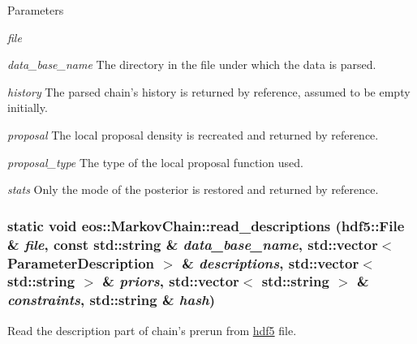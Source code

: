 \begin{DoxyParams}{Parameters}
\item[{\em file}]\item[{\em data\_\-base\_\-name}]The directory in the file under which the data is parsed. \item[{\em history}]The parsed chain's history is returned by reference, assumed to be empty initially. \item[{\em proposal}]The local proposal density is recreated and returned by reference. \item[{\em proposal\_\-type}]The type of the local proposal function used. \item[{\em stats}]Only the mode of the posterior is restored and returned by reference. \end{DoxyParams}
\hypertarget{classeos_1_1MarkovChain_acbcd604ef986e97891f0e358e045c117}{
\subsubsection[{read\_\-descriptions}]{\setlength{\rightskip}{0pt plus 5cm}static void eos::MarkovChain::read\_\-descriptions ({\bf hdf5::File} \& {\em file}, \/  const std::string \& {\em data\_\-base\_\-name}, \/  std::vector$<$ {\bf ParameterDescription} $>$ \& {\em descriptions}, \/  std::vector$<$ std::string $>$ \& {\em priors}, \/  std::vector$<$ std::string $>$ \& {\em constraints}, \/  std::string \& {\em hash})}}
\label{classeos_1_1MarkovChain_acbcd604ef986e97891f0e358e045c117}
Read the description part of chain's prerun from \hyperlink{namespaceeos_1_1hdf5}{hdf5} file.


